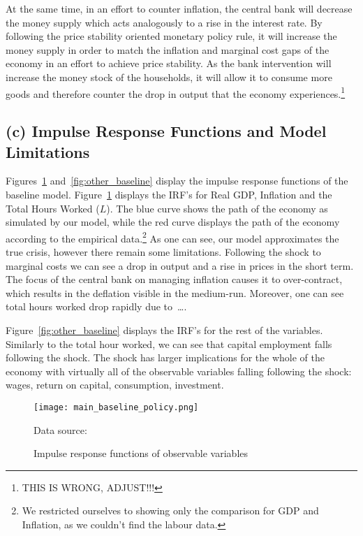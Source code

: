 \documentclass[12pt]{article}
\begin{document}
At the same time, in an effort to counter inflation, the central bank will decrease the money supply which acts analogously to a rise in the interest rate. By following the price stability oriented monetary policy rule, it will increase the money supply in order to match the inflation and marginal cost gaps of the economy in an effort to achieve price stability. As the bank intervention will increase the money stock of the households, it will allow it to consume more goods and therefore counter the drop in output that the economy experiences.\footnote{THIS IS WRONG, ADJUST!!!}

\subsection*{(c) Impulse Response Functions and Model Limitations}

Figures~\ref{fig:main_baseline} and~\ref{fig:other_baseline} display the impulse response functions of the baseline model. Figure~\ref{fig:main_baseline} displays the IRF's for Real GDP, Inflation and the Total Hours Worked ($L$). The blue curve shows the path of the economy as simulated by our model, while the red curve displays the path of the economy according to the empirical data.\footnote{We restricted ourselves to showing only the comparison for GDP and Inflation, as we couldn't find the labour data.} As one can see, our model approximates the true crisis, however there remain some limitations. Following the shock to marginal costs we can see a drop in output and a rise in prices in the short term. The focus of the central bank on managing inflation causes it to over-contract, which results in the deflation visible in the medium-run. Moreover, one can see total hours worked drop rapidly due to\ \dots. 

Figure~\ref{fig:other_baseline} displays the IRF's for the rest of the variables. Similarly to the total hour worked, we can see that capital employment falls following the shock. The shock has larger implications for the whole of the economy with virtually all of the observable variables falling following the shock: wages, return on capital, consumption, investment. 

\begin{figure}[!h]
    \caption{Impulse response functions of observable variables}\label{fig:main_baseline}
    \centering
    \texttt{[image: main\_baseline\_policy.png]}
    
    \tiny{Data source: \citeauthor{worldbank_inflation_ca}}
\end{figure}
\end{document}
